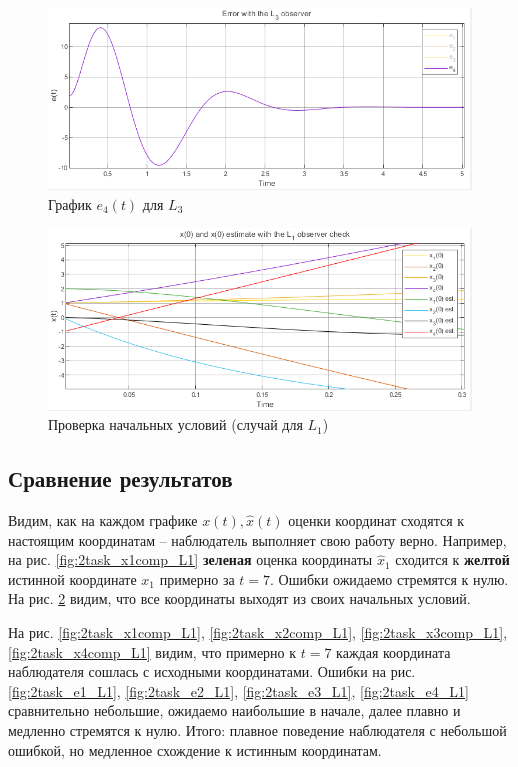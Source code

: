 \documentclass[a4paper, 12pt]{article}
\begin{document}
    \begin{figure}[H]
        \centering
        \includegraphics[scale=0.7]{2task_e4_L3.png}
        \captionsetup{skip=0pt}
        \caption{График $e_4(t)$ для $L_3$}
        \label{fig:2task_e4_L3}
    \end{figure}
    \begin{figure}[H]
        \centering
        \includegraphics[scale=0.7]{2task_x0_L1.png}
        \captionsetup{skip=0pt}
        \caption{Проверка начальных условий (случай для $L_1$)}
        \label{fig:2task_x0_L1}
    \end{figure}


    \subsection{Сравнение результатов}
    Видим, как на каждом графике $x(t),\hat{x}(t)$ оценки координат сходятся к настоящим координатам -- наблюдатель
    выполняет свою работу верно. Например, на рис. \ref{fig:2task_x1comp_L1} \textbf{зеленая} оценка координаты $\hat{x}_1$ сходится
    к \textbf{желтой} истинной координате $x_1$ примерно за $t=7$. Ошибки ожидаемо стремятся к нулю. На рис. \ref{fig:2task_x0_L1}
    видим, что все координаты выходят из своих начальных условий.


    На рис. \ref{fig:2task_x1comp_L1}, \ref{fig:2task_x2comp_L1}, \ref{fig:2task_x3comp_L1}, \ref{fig:2task_x4comp_L1} видим, что примерно к $t=7$ каждая координата наблюдателя сошлась с исходными координатами.
    Ошибки на рис. \ref{fig:2task_e1_L1}, \ref{fig:2task_e2_L1}, \ref{fig:2task_e3_L1}, \ref{fig:2task_e4_L1} сравнительно небольшие, ожидаемо наибольшие в начале, далее плавно и медленно стремятся к нулю.
    Итого: плавное поведение наблюдателя с небольшой ошибкой, но медленное схождение к истинным координатам.
\end{document}
